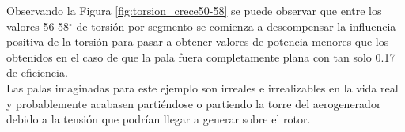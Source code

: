 Observando la Figura \ref{fig:torsion_crece50-58} se puede observar que entre los valores 56-58$^{\circ}$ de torsión por segmento se comienza a descompensar la influencia positiva de la torsión para pasar a obtener valores de potencia menores que los obtenidos en el caso de que la pala fuera completamente plana con tan solo 0.17 de eficiencia.\\


Las palas imaginadas para este ejemplo son irreales e irrealizables en la vida real y probablemente acabasen partiéndose o partiendo la torre del aerogenerador debido a la tensión que podrían llegar a generar sobre el rotor.
